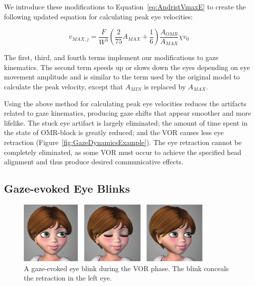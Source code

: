 We introduce these modifications to Equation~\ref{eq:AndristVmaxE} to create the following updated equation for calculating peak eye velocities:

\begin{equation}
v_{MAX,j} = \frac{F}{W^3}( \frac{2}{75} A_{MAX} + \frac{1}{6} ) \frac{A_{OMR}}{A_{MAX}} \chi v_0%
\end{equation}

The first, third, and fourth terms implement our modifications to gaze kinematics. The second term speeds up or slows down the eyes depending on eye movement amplitude and is similar to the term used by the original model to calculate the peak velocity, except that $A_{MIN}$ is replaced by $A_{MAX}$.

Using the above method for calculating peak eye velocities reduces the artifacts related to gaze kinematics, producing gaze shifts that appear smoother and more lifelike. The stuck eye artifact is largely eliminated; the amount of time spent in the state of OMR-block is greatly reduced; and the VOR causes less eye retraction (Figure~\ref{fig:GazeDynamicsExample}). The eye retraction cannot be completely eliminated, as some VOR must occur to achieve the specified head alignment and thus produce desired communicative effects.

\subsection{Gaze-evoked Eye Blinks}

\begin{figure}
\centering
\includegraphics[width=0.85\textwidth]{stylizedgaze/Figures/GazeEvokedBlinkVOR-small.pdf}
\caption{A gaze-evoked eye blink during the VOR phase. The blink conceals the retraction in the left eye.}
\label{fig:GazeEvokedBlinkVOR}
\end{figure}

